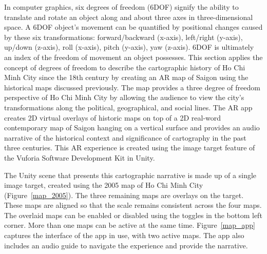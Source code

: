 In computer graphics, six degrees of freedom (6DOF) signify the ability to translate and rotate an object along and about three axes in three-dimensional space. A 6DOF object’s movement can be quantified by positional changes caused by these six transformations: forward/backward (x-axis), left/right (y-axis), up/down (z-axis), roll (x-axis), pitch (y-axis), yaw (z-axis). 6DOF is ultimately an index of the freedom of movement an object possesses. This section applies the concept of degrees of freedom to describe the cartographic history of Ho Chi Minh City since the 18th century by creating an AR map of Saigon using the historical maps discussed previously. The map provides a three degree of freedom perspective of Ho Chi Minh City by allowing the audience to view the city’s transformations along the political, geographical, and social lines. The AR app creates 2D virtual overlays of historic maps on top of a 2D real-word contemporary map of Saigon hanging on a vertical surface and provides an audio narrative of the historical context and significance of cartography in the past three centuries. This AR experience is created using the image target feature of the Vuforia Software Development Kit in Unity.

The Unity scene that presents this cartographic narrative is made up of a single image target, created using the 2005 map of Ho Chi Minh City (Figure~\ref{map_2005}). The three remaining maps are overlays on the target. These maps are aligned so that the scale remains consistent across the four maps. The overlaid maps can be enabled or disabled using the toggles in the bottom left corner. More than one maps can be active at the same time. Figure~\ref{map_app} captures the interface of the app in use, with two active maps. The app also includes an audio guide to navigate the experience and provide the narrative.
\en 

\begin{figure}[!ht]
\end{figure}

